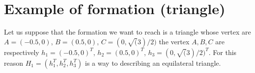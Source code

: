 \section{Example of formation (triangle)}
Let us suppose that the formation we want to reach is a triangle whose vertex are $A=(-0.5, 0)$, $B=(0.5, 0)$, $C=(0, \sqrt(3)/2)$ the vertex $A, B, C$ are respectively $h_1=(-0.5, 0)^T$, $h_2=(0.5, 0)^T$, $h_3=(0, \sqrt(3)/2)^T$. For this reason $H_1=(h_1^T,h_2^T, h_3^T)$ is a way to describing an equilateral triangle.
